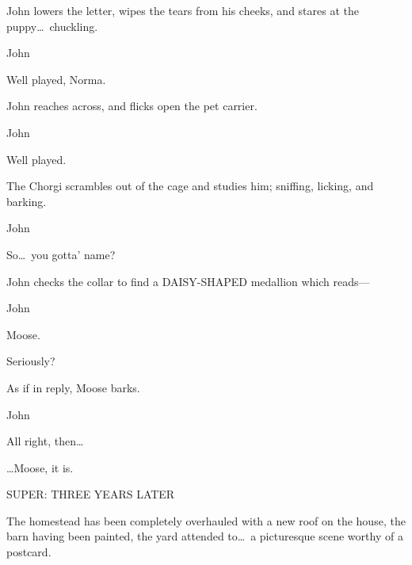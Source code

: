 \documentclass[letterpaper,literary]{screenwriter}
\begin{document}
John lowers the letter, wipes the tears from his cheeks, and stares at
the puppy\dots\ chuckling.

\begin{dialogue}{John}

    Well played, Norma.

\end{dialogue}

John reaches across, and flicks open the pet carrier.

\begin{dialogue}[mutters]{John \contd}

    Well played.

\end{dialogue}

The Chorgi scrambles out of the cage and studies him; sniffing, licking,
and barking.

\begin{dialogue}{John \contd}

    So\dots\ you gotta' name?

\end{dialogue}

John checks the collar to find a DAISY-SHAPED medallion which reads---

\begin{dialogue}{John \contd}

    Moose.


    Seriously?

\end{dialogue}

As if in reply, Moose barks.

\begin{dialogue}{John \contd}

    All right, then\dots


    \dots Moose, it is.

\end{dialogue}

\fadeout


SUPER: THREE YEARS LATER

The homestead has been completely overhauled with a new roof on the
house, the barn having been painted, the yard attended
to\dots\ a picturesque scene worthy of a postcard.

\end{document}
